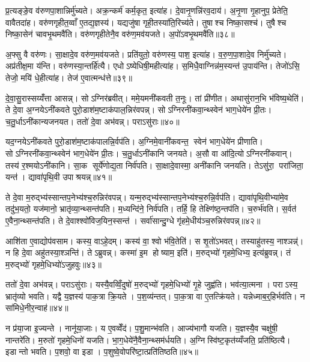 प्र॒त्यङ्ङे॒व व॑रुणपा॒शान्निर्मु॑च्यते। अक्र॒न्कर्म॑ कर्म॒कृत॒ इत्या॑ह। दे॒वानृ॒णन्नि॑रव॒दाय॑। अ॒नृ॒णा गृ॒हानुप॒ प्रेतेति॒ वावैतदा॑ह। वरु॑णगृहीत॒व्वाँ ए॒तद्य॒ज्ञस्य॑। यद्यजु॑षा गृही॒तस्या॑ति॒रिच्य॑ते। तुषाश्च निष्का॒सश्च॑। तुषैश्च निष्का॒सेन॑ चावभृ॒थमवै॑ति। वरु॑णगृहीतेनै॒व वरु॑ण॒मव॑यजते। अ॒पो॑ऽवभृ॒थमवै॑ति॥३८॥

अ॒फ्सु वै वरु॑णः। सा॒क्षादे॒व वरु॑ण॒मव॑यजते। प्रति॑युतो॒ वरु॑णस्य॒ पाश॒ इत्या॑ह। व॒रु॒ण॒पा॒शादे॒व निर्मु॑च्यते। अप्र॑तीक्ष॒मा य॑न्ति। वरु॑णस्या॒न्तर्\mbox{}हि॑त्यै। एधोऽष्येधिषी॒महीत्या॑ह। स॒मिधै॒वाग्निन्न॑म॒स्यन्त॑ उ॒पाय॑न्ति। तेजो॑ऽसि॒ तेजो॒ मयि॑ धे॒हीत्या॑ह। तेज॑ ए॒वात्मन्ध॑त्ते॥३९॥

दे॒वा॒सु॒रास्सय्यँ॑त्ता आसन्न्। सोऽग्निर॑ब्रवीत्। ममे॒यमनी॑कवती त॒नूः। तां प्री॑णीत। अथासु॑रान॒भि भ॑विष्य॒थेति॑। ते दे॒वा अ॒ग्नयेऽनी॑कवते पुरो॒डाश॑म॒ष्टाक॑पाल॒न्निर॑वपन्न्। सोऽग्निरनी॑कवा॒न्थ्स्वेन॑ भाग॒धेये॑न प्री॒तः। च॒तु॒र्धाऽनी॑कान्यजनयत। ततो॑ दे॒वा अभ॑वन्न्। पराऽसु॑राः॥४०॥

यद॒ग्नयेऽनी॑कवते पुरो॒डाश॑म॒ष्टाक॑पालन्नि॒र्वप॑ति। अ॒ग्निमे॒वानी॑कवन्त॒ स्वेन॑ भाग॒धेये॑न प्रीणाति। सोऽग्निरनी॑कवा॒न्थ्स्वेन॑ भाग॒धेये॑न प्री॒तः। च॒तु॒र्धाऽनी॑कानि जनयते। अ॒सौ वा आ॑दि॒त्योऽग्निरनी॑कवान्। तस्य॑ र॒श्मयोऽनी॑कानि। सा॒क सूर्ये॑णोद्य॒ता निर्व॑पति। सा॒क्षादे॒वास्मा॒ अनी॑कानि जनयति। तेऽसु॑रा॒ परा॑जिता॒ यन्त॑। द्यावा॑पृथि॒वी उपाश्रयन्न्॥४१॥

ते दे॒वा म॒रुद्भ्य॑स्सान्तप॒नेभ्य॑श्च॒रुन्निर॑वपन्न्। यन्म॒रुद्भ्य॑स्सान्तप॒नेभ्य॑श्च॒रुन्नि॒र्वप॑ति। द्यावा॑पृथि॒वीभ्या॑मे॒व तदु॑भ॒यतो॒ यज॑मानो॒ भ्रातृ॑व्या॒न्थ्सन्त॑पति। म॒ध्यन्दि॑ने॒ निर्व॑पति। तर्\mbox{}हि॒ हि तेक्ष्णि॑ष्ठ॒न्तप॑ति। च॒रुर्भ॑वति। स॒र्वत॑ ए॒वैना॒न्थ्सन्त॑पति। ते दे॒वाश्श्वो॑विज॒यिन॒स्सन्त॑। सर्वा॑सान्दु॒ग्धे गृ॑हमे॒धीय॑ञ्च॒रुन्निर॑वपन्न्॥४२॥

आशि॑ता ए॒वाद्योप॑वसाम। कस्य॒ वाऽहे॒दम्। कस्य॑ वा॒ श्वो भ॑वि॒तेति॑। स शृ॒तो॑ऽभवत्। तस्याहु॑तस्य॒ नाश्ञन्न्॑। न हि दे॒वा अहु॑तस्या॒श्ञन्ति॑। तेऽब्रुवन्न्। कस्मा॑ इ॒म होष्याम॒ इति॑। म॒रुद्भ्यो॑ गृहमे॒धिभ्य॒ इत्य॑ब्रुवन्न्। तं म॒रुद्भ्यो॑ गृहमे॒धिभ्यो॑ऽजुहवुः॥४३॥

ततो॑ दे॒वा अभ॑वन्न्। पराऽसु॑राः। यस्यै॒वव्विँ॒दुषो॑ म॒रुद्भ्यो॑ गृहमे॒धिभ्यो॑ गृ॒हे जुह्व॑ति। भव॑त्या॒त्मना। पराऽस्य॒ भ्रातृ॑व्यो भवति। यद्वै य॒ज्ञस्य॑ पाक॒त्रा क्रि॒यते। प॒श॒व्य॑न्तत्। पा॒क॒त्रा वा ए॒तत्क्रि॑यते। यन्नेध्माब॒र्॒हिर्भव॑ति। न सा॑मिधे॒नीर॒न्वाह॑॥४४॥

न प्र॑या॒जा इ॒ज्यन्ते। नानू॑या॒जाः। य ए॒वव्वेँद॑। प॒शु॒मान्भ॑वति। आज्य॑भागौ यजति। य॒ज्ञस्यै॒व चक्षु॑षी॒ नान्तरे॑ति। म॒रुतो॑ गृहमे॒धिनो॑ यजति। भा॒ग॒धेये॑नै॒वैना॒न्थ्सम॑र्धयति। अ॒ग्निस्वि॑ष्ट॒कृत॑य्यँजति॒ प्रति॑ष्ठित्यै। इडान्तो भवति। प॒शवो॒ वा इडा। प॒शुष्वे॒वोपरि॑ष्टा॒त्प्रति॑तिष्ठति॥४५॥

